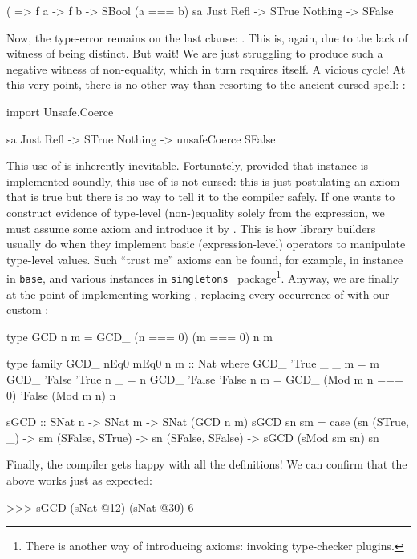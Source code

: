 \documentclass[demotion-paper.tex]{subfiles}
\begin{document}
\begin{code}
(%
       => f a -> f b -> SBool (a === b)
sa %
  Just Refl -> STrue
  Nothing -> SFalse  
\end{code}

Now, the type-error remains on the last clause: .
This is, again, due to the lack of witness of being distinct.
But wait! We are just struggling to produce such a negative witness of non-equality, which in turn requires itself. A vicious cycle!
At this very point, there is no other way than resorting to the ancient cursed spell: :
\begin{code}
import Unsafe.Coerce

sa %
  Just Refl -> STrue
  Nothing -> unsafeCoerce SFalse  
\end{code}
This use of  is inherently inevitable.
Fortunately, provided that  instance is implemented soundly, this use of  is not cursed: this is just postulating an axiom that is true but there is no way to tell it to the compiler safely.
If one wants to construct evidence of type-level (non-)equality solely from the expression, we must assume some axiom and introduce it by .
This is how library builders usually do when they implement basic (expression-level) operators to manipulate type-level values.
Such ``trust me'' axioms can be found, for example, in  instance in \texttt{base}, and various  instances in \texttt{singletons}~\cite{singletons} package\footnote{There is another way of introducing axioms: invoking type-checker plugins.}.
Anyway, we are finally at the point of implementing working , replacing every occurrence of \hask{(==)} with our custom \hask{(===)}:

\begin{code}
type GCD n m = GCD_ (n === 0) (m === 0) n m

type family GCD_ nEq0 mEq0 n m :: Nat where
  GCD_ 'True  _      _ m = m
  GCD_ 'False 'True  n _ = n
  GCD_ 'False 'False n m = 
    GCD_ (Mod m n === 0) 'False (Mod m n) n

sGCD :: SNat n -> SNat m -> SNat (GCD n m)
sGCD sn sm =
  case (sn %
    (STrue, _) -> sm
    (SFalse, STrue) -> sn
    (SFalse, SFalse) -> sGCD (sMod sm sn) sn
\end{code}

Finally, the compiler gets happy with all the definitions!
We can confirm that the above  works just as expected:
\begin{repl}
>>> sGCD (sNat @12) (sNat @30)
6
\end{repl}
\end{document}
